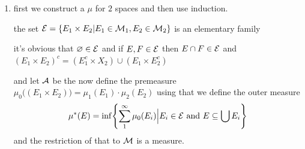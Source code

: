 \documentclass{article}
\begin{document}
\begin{homeworkProblem}
    \begin{enumerate}[label=\alph*.]
        \item first we construct a $\mu$ for $2$ spaces and then use induction.
        \begin{lemma}
            the set $\mathcal{E}=\{E_1\times E_2 | E_1\in\mathcal{M}_1, E_2\in\mathcal{M}_2\}$ is an elementary family
        \end{lemma}
        \begin{trivialproof}
            it's obvious that $\varnothing \in \mathcal{E}$ and if $E,F\in\mathcal{E}$ then $E \cap F \in \mathcal{E}$ and $(E_1 \times E_2)^c = (E_1^c \times X_2) \cup (E_1 \times E_2^c)$
        \end{trivialproof}
        and let $\mathcal{A}$ be the now define the premeasure $\mu_0\bigl((E_1 \times E_2)\bigr) = \mu_1(E_1)\cdot \mu_2(E_2)$ using that we define the outer measure 
        \[
            \mu^*(E)=\inf\left\{\sum_1^\i \mu_0(E_i)\Big|E_i\in\mcl{E} \text{ and } E\subseteq\bigcup E_i\right\}
        \]
        and the restriction of that to $\mathcal{M}$ is a measure.
    \end{enumerate}
\end{homeworkProblem}
\end{document}
